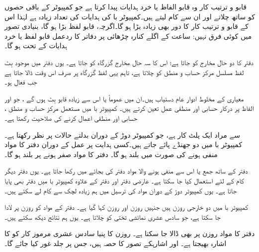 قابو و ترتیب کار وہ قابو الفاظ یا خرد ہدایات پیدا کرتا ہے جو    کمپیوٹر  کے باقی حصوں کو  ساتھ چلاتے اور ان سے کام   لیتے ہیں۔کمپیوٹر با کی ہدایات کی تعداد زیادہ ہے لہٰذا  اس کے قابو و ترتیب کار  کا دور بھی زیادہ بڑا ہو گا۔اگرچہ، قابو لفظ بڑا ہو گا، بنیادی تصور میں کوئی فرق نہیں: ساعت کے اگلے کنارہ چڑھائی پر دفاتر کا ردعمل   قابو لفظ یا خرد ہدایات کے تحت ہو گا۔

دفتر  کا دو حال مخارج  کو جاتا ہے؛ اس کا سہ حال مخارج  گزرگاہ کو جاتا ہے۔ یوں دفتر  میں موجود  بِٹ لفظ مسلسل مرکز حساب و منطق کو چلاتا ہے، تاہم  یہی لفظ گزرگاہ پر صرف اس وقت  ڈالا جاتا ہے  جب  فعال ہو۔

معیاری      کے مخلوط ادوار عام دستیاب ہیں۔ان    میں عموماً  یا اس سے زیادہ  قابو بِٹ  ہوں گے ، جو   اور  الفاظ پر درکار حسابی اور منطقی عمل  تعین کرتے ہیں۔  کمپیوٹر با  میں مستعمل  مرکز حساب و منطق ، حسابی  اور منطقی اعمال کرنے کی صلاحیت رکھتا  ہے۔

 سے مراد    ایک   پلٹ کار  ہے، جو  کمپیوٹر دوڑ کے دوران بدلتے حالات   پر نظر رکھتا ہے۔ کمپیوٹر با میں دو جھنڈے پائے جاتے ہیں۔کسی ہدایت پر عمل کے دوران دفتر  کا مواد منفی ہونے  کی صورت میں   بلند ہو گا۔ دفتر  کا مواد صفر ہونے پر  بلند ہو گا۔

دفتر  کے ساتھ جمع  یا اس سے منفی ہونے والا مواد دفتر  کی بجائے میں رکھا جاتا ہے۔ یوں دفتر  دیگر کام کے لئے استعمال کیا جا سکتا ہے۔ عارضی دفتر اور دفتر  کے علاوہ کمپیوٹر با میں دفتر  بھی پایا جاتا ہے۔ یوں کمپیوٹر دوڑ کے دوران  مواد کی ترسیل میں ہم زیادہ لچک سے کام لے سکتے ہیں۔

کمپیوٹر  با میں دو خارجی روزن ہیں جنہیں روزن  اور روزن  کہا گیا ہے۔ دفتر  کے مواد کو روزن  پر لادا جا سکتا ہے،  جو سادس عشری نمائشی تختی کو چلاتا ہے۔ یوں ہم نتائج دیکھ سکتے ہیں۔

دفتر  کا مواد  روزن  پر بھی ڈالا جا سکتا ہے۔ روزن  کا پنیا  سادس عشری  مرموز کار کو  کا اشارہ  بھیجتا  ہے۔ اور   اشارہکے تصور کا حصہ ہیں، جس پر جلد غور کیا جائے گا۔

